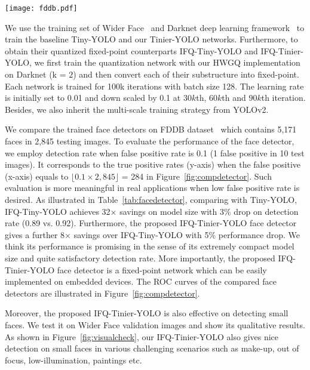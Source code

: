 \documentclass[10pt,twocolumn,letterpaper]{article}
\begin{document}
\begin{figure*}[!htb]
	\begin{center}
		\texttt{[image: fddb.pdf]}
	\end{center}
	\caption{Qualitative performance of the proposed IFQ-Tiner-YOLO ($k=2$) face detector on Wider Face dataset~\cite{widerface}.}
	\label{fig:visualcheck}
\end{figure*}

We use the training set of Wider Face~\cite{widerface} and Darknet deep learning framework~\cite{darknet} to train the baseline Tiny-YOLO and our Tinier-YOLO networks. Furthermore, to obtain their quantized fixed-point counterparts IFQ-Tiny-YOLO and IFQ-Tinier-YOLO, we first train the quantization network with our HWGQ implementation on Darknet (k = $2$) and then convert each of their substructure into fixed-point. Each network is trained for 100k iterations with batch size 128. The learning rate is initially set to 0.01 and down scaled by 0.1 at $30k$th, $60k$th and $90k$th iteration. Besides, we also inherit the multi-scale training strategy from YOLOv2.



We compare the trained face detectors on FDDB dataset~\cite{FDDB} which contains 5,171 faces in 2,845 testing images. To evaluate the performance of the face detector, we employ detection rate when false positive rate is 0.1 (1 false positive in 10 test images). It corresponds to the true positive rates (y-axis) when the false positive (x-axis) equals to $\lfloor0.1\times2,845\rfloor$ = 284 in Figure~\ref{fig:compdetector}. Such evaluation is more meaningful in real applications when low false positive rate is desired. As illustrated in Table~\ref{tab:facedetector}, comparing with Tiny-YOLO, IFQ-Tiny-YOLO achieves 32$\times$ savings on model size with 3\% drop on detection rate (0.89 vs. 0.92). Furthermore, the proposed IFQ-Tinier-YOLO face detector gives a further 8$\times$ savings over IFQ-Tiny-YOLO with 5\% performance drop. We think its performance is promising in the sense of its extremely compact model size and quite satisfactory detection rate. More importantly, the proposed IFQ-Tinier-YOLO face detector is a fixed-point network which can be easily implemented on embedded devices. The ROC curves of the compared face detectors are illustrated in Figure~\ref{fig:compdetector}. 

Moreover, the proposed IFQ-Tinier-YOLO is also effective on detecting small faces. We test it on Wider Face validation images and show its qualitative results. As shown in Figure~\ref{fig:visualcheck}, our IFQ-Tinier-YOLO also gives nice detection on small faces in various challenging scenarios such as make-up, out of focus, low-illumination, paintings etc.
\end{document}
